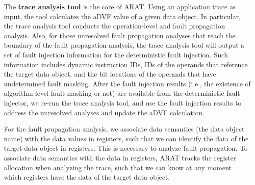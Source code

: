 The \textbf{trace analysis tool} is the core of ARAT. Using an application trace as input, the tool calculates the aDVF value of a given data object.
In particular, the trace analysis tool conducts the operation-level and fault propagation analysis. %
Also, for those unresolved fault propagation analyses that reach the boundary of the fault propagation analysis,   
the trace analysis tool will output 
a set of fault injection information for the deterministic fault injection. Such information includes dynamic instruction IDs, IDs of the operands that reference the target data object, and the bit locations of the operands that have undetermined fault masking.
After the fault injection results (i.e., the existence of algorithm-level fault masking or not) are available from the deterministic fault injector,
we re-run the trace analysis tool, and use the fault injection results to address the unresolved analyses and update the aDVF calculation. 

For the fault propagation analysis, we associate data semantics (the data object name) with the data values in registers,
such that we can identify the data of the target data object in registers. %
This is necessary to analyze fault propagation.
To associate data semantics with the data in registers, 
ARAT tracks the register allocation when analyzing the trace, such that we can know at any moment which registers have the data of the target data object. 

